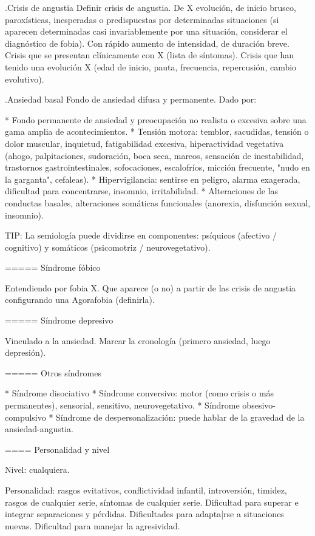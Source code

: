 \documentclass{scrbook}
\begin{document}
.Crisis de angustia
Definir crisis de angustia. De X evolución, de inicio brusco, paroxísticas, inesperadas o predispuestas por determinadas situaciones (si aparecen determinadas casi invariablemente por una situación, considerar el diagnóstico de fobia). Con rápido aumento de intensidad, de duración breve.  Crisis que se presentan clínicamente con X (lista de síntomas). Crisis que han tenido una evolución X (edad de inicio, pauta, frecuencia, repercusión, cambio evolutivo).

.Ansiedad basal
Fondo de ansiedad difusa y permanente. Dado por:

* Fondo permanente de ansiedad y preocupación no realista o excesiva sobre una gama amplia de acontecimientos.
* Tensión motora: temblor, sacudidas, tensión o dolor muscular, inquietud, fatigabilidad excesiva, hiperactividad vegetativa (ahogo, palpitaciones, sudoración, boca seca, mareos, sensación de inestabilidad, trastornos gastrointestinales, sofocaciones, escalofríos, micción frecuente, "nudo en la garganta", cefaleas).
* Hipervigilancia: sentirse en peligro, alarma exagerada, dificultad para concentrarse, insomnio, irritabilidad.
* Alteraciones de las conductas basales, alteraciones somáticas funcionales (anorexia, disfunción sexual, insomnio).

TIP: La semiología puede dividirse en componentes: psíquicos (afectivo / cognitivo) y somáticos (psicomotriz / neurovegetativo).

===== Síndrome fóbico

Entendiendo por fobia X. Que aparece (o no) a partir de las crisis de angustia configurando una Agorafobia (definirla).

===== Síndrome depresivo

Vinculado a la ansiedad. Marcar la cronología (primero ansiedad, luego depresión).

===== Otros síndromes

* Síndrome disociativo
* Síndrome conversivo: motor (como crisis o más permanentes), sensorial, sensitivo, neurovegetativo.
* Síndrome obsesivo-compulsivo
* Síndrome de despersonalización: puede hablar de la gravedad de la ansiedad-angustia.

==== Personalidad y nivel

Nivel: cualquiera.

Personalidad: rasgos evitativos, conflictividad infantil, introversión, timidez, rasgos de cualquier serie, síntomas de cualquier serie. Dificultad para superar e integrar separaciones y pérdidas. Dificultades para adapta|rse a situaciones nuevas. Dificultad para manejar la agresividad.
\end{document}

